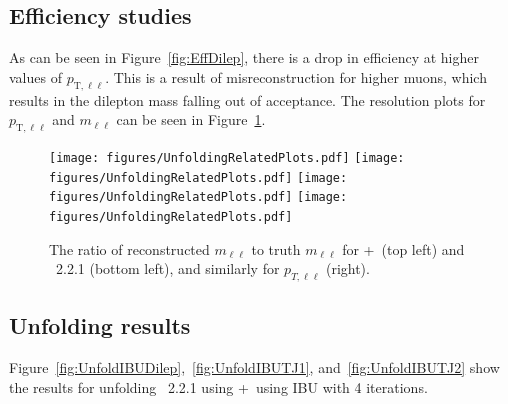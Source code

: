 \subsection{Efficiency studies}

As can be seen in Figure~\ref{fig:EffDilep}, there is a drop in efficiency at higher values of $p_{\text{T},\ell\ell}$. This is a result of \pt misreconstruction for higher \pt muons, which results in the dilepton mass falling out of acceptance.
The resolution plots for $p_{\text{T},\ell\ell}$ and $m_{\ell\ell}$ can be seen in Figure~\ref{fig:Resmll}.

\begin{figure}
  \centering
  \texttt{[image: figures/UnfoldingRelatedPlots.pdf]}
  \texttt{[image: figures/UnfoldingRelatedPlots.pdf]}
  \texttt{[image: figures/UnfoldingRelatedPlots.pdf]}
  \texttt{[image: figures/UnfoldingRelatedPlots.pdf]}
  \caption{The ratio of reconstructed $m_{\ell\ell}$ to truth $m_{\ell\ell}$ for \powheg+\pythia~(top left) and \sherpa~2.2.1 (bottom left), and similarly for $p_{T,\ell\ell}$ (right).}
  \label{fig:Resmll}
\end{figure}

\subsection{Unfolding results}
Figure~\ref{fig:UnfoldIBUDilep},~\ref{fig:UnfoldIBUTJ1}, and~\ref{fig:UnfoldIBUTJ2} show the results for unfolding \sherpa~2.2.1 using \powheg+\pythia~using IBU with 4 iterations.


